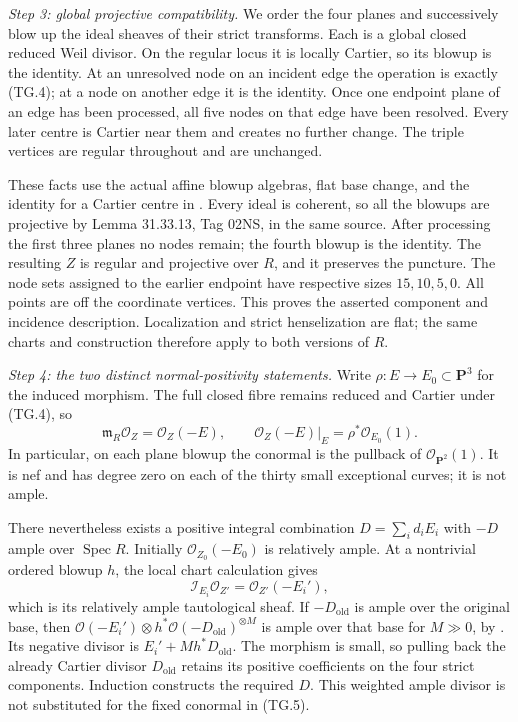 \emph{Step 3: global projective compatibility.}
We order the four planes and successively blow up the ideal sheaves of
their strict transforms.  Each is a global closed reduced Weil
divisor.  On the regular locus it is locally Cartier, so its blowup
is the identity.  At an unresolved node on an incident edge the
operation is exactly (TG.4); at a node on another edge it is the
identity.  Once one endpoint plane of an edge has been processed,
all five nodes on that edge have been resolved.  Every later centre
is Cartier near them and creates no further change.  The triple
vertices are regular throughout and are unchanged.

These facts use the actual affine blowup algebras, flat base change,
and the identity for a Cartier centre in
\citet[Lemmas 31.33.2--31.33.4 and 31.33.7, Tags 0804, 0805, 02OS,
and 0807]{rootStacksBlowup}.  Every ideal is coherent, so all the
blowups are projective by Lemma 31.33.13, Tag 02NS, in the same source.
After processing the first three planes no nodes remain; the fourth
blowup is the identity.  The resulting $Z$ is regular and projective
over $R$, and it preserves the puncture.  The node sets assigned to
the earlier endpoint have respective sizes $15,10,5,0$.  All points
are off the coordinate vertices.  This proves the asserted component
and incidence description.  Localization and strict henselization
are flat; the same charts and construction therefore apply to both
versions of $R$.

\emph{Step 4: the two distinct normal-positivity statements.}
Write $\rho:E\to E_0\subset\mathbf P^3$ for the induced morphism.
The full closed fibre remains reduced and Cartier under (TG.4), so
\begin{equation}
 \mathfrak m_R\mathcal O_Z=\mathcal O_Z(-E),\qquad
 \mathcal O_Z(-E)|_E=\rho^*\mathcal O_{E_0}(1).
 \tag{TG.5}
\end{equation}
In particular, on each plane blowup the conormal is the pullback of
$\mathcal O_{\mathbf P^2}(1)$.  It is nef and has degree zero on each
of the thirty small exceptional curves; it is not ample.

There nevertheless exists a positive integral combination
$D=\sum_i d_iE_i$ with $-D$ ample over $\operatorname{Spec}R$.
Initially $\mathcal O_{Z_0}(-E_0)$ is relatively ample.  At a nontrivial
ordered blowup $h$, the local chart calculation gives
\[
 \mathcal I_{E_i}\mathcal O_{Z'}=\mathcal O_{Z'}(-E_i'),
\]
which is its relatively ample tautological sheaf.  If $-D_{\mathrm{old}}$
is ample over the original base, then
$\mathcal O(-E_i')\otimes h^*\mathcal O(-D_{\mathrm{old}})^{\otimes M}$
is ample over that base for $M\gg0$, by
\citet[Lemma 29.38.8, Tag 0C4K]{frC3beStacksCompositeAmple}.
Its negative divisor is $E_i'+M h^*D_{\mathrm{old}}$.
The morphism is small, so pulling back the already Cartier divisor
$D_{\mathrm{old}}$ retains its positive coefficients on the four
strict components.  Induction constructs the required $D$.
This weighted ample divisor is not substituted for the fixed
conormal in (TG.5).

